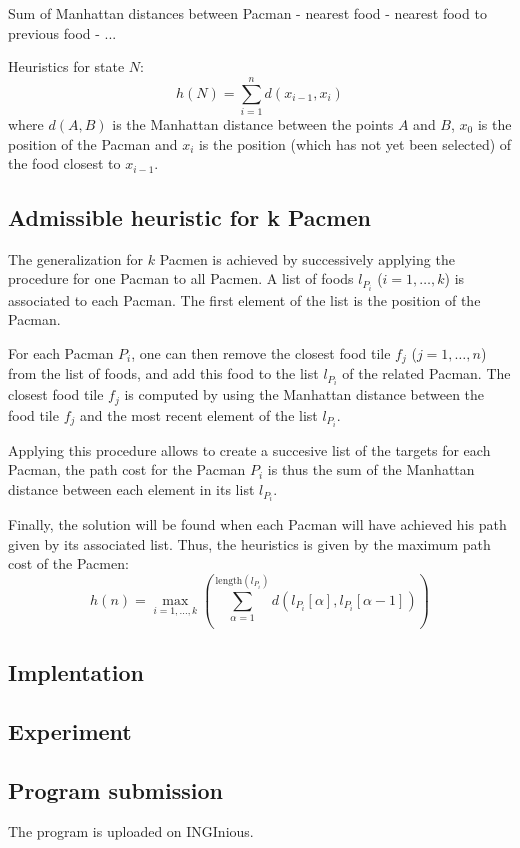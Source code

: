\documentclass[journal]{IEEEtran}
\begin{document}
Sum of Manhattan distances between Pacman - nearest food - nearest food to previous food - ... 

Heuristics for state $N$:
\[
 h(N) = \sum_{i=1}^n d(x_{i-1},x_i)
\]
where $d(A,B)$ is the Manhattan distance between the points $A$ and $B$, $x_0$ is the position of the Pacman and $x_i$ is the position (which has not yet been selected) of the food closest to $x_{i-1}$.



\subsection{Admissible heuristic for k Pacmen}

The generalization for $k$ Pacmen is achieved by successively applying the procedure for one Pacman to all Pacmen. A list of foods $l_{P_i}$ ($i=1,\dots,k$) is associated to each Pacman. The first element of the list is the position of the Pacman. 

For each Pacman $P_i$, one can then remove the closest food tile $f_j$ ($j=1,\dots,n$) from the list of foods, and add this food to the list $l_{P_i}$ of the related Pacman. The closest food tile $f_j$ is computed by using the Manhattan distance between the food tile $f_j$ and the most recent element of the list $l_{P_i}$. 

Applying this procedure allows to create a succesive list of the targets for each Pacman, the path cost for the Pacman $P_i$ is thus the sum of the Manhattan distance between each element in its list $l_{P_i}$. 

Finally, the solution will be found when each Pacman will have achieved his path given by its associated list. Thus, the heuristics is given by the maximum path cost of the Pacmen:
\[
 h(n) = \max_{i = 1,\dots,k} \left(\sum_{\alpha=1}^{\mathrm{length}(l_{P_i})} d\left(l_{P_i}[\alpha],l_{P_i}[\alpha-1]\right)\right)
\]


\subsection{Implentation}



\subsection{Experiment}



\subsection{Program submission}

The program is uploaded on INGInious.
\end{document}
